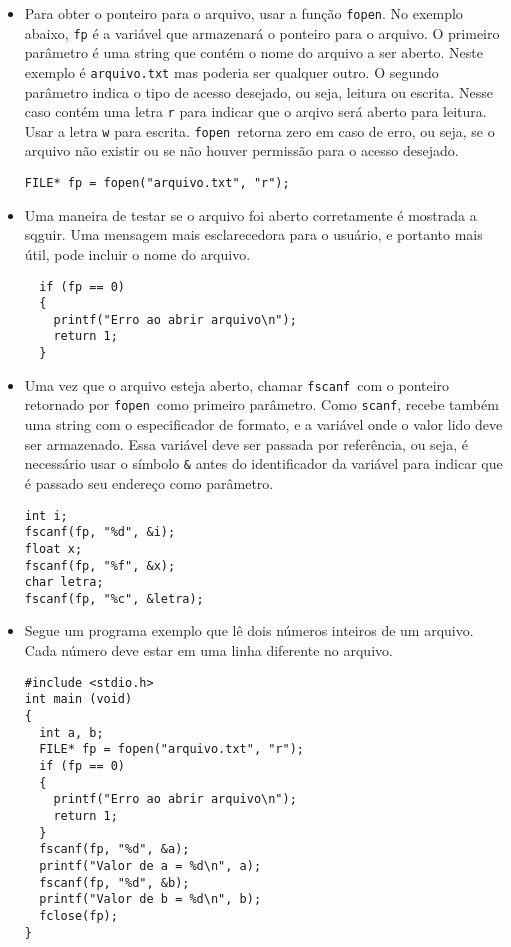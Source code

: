 \documentclass{book}
\newcommand{\SCANF}{{\tt scanf}}
\newcommand{\FSCANF}{{\tt fscanf}}
\newcommand{\FOPEN}{{\tt fopen}}
\begin{document}
\begin{itemize}

\item Para obter o ponteiro para o arquivo, usar a função \FOPEN. No exemplo abaixo, {\tt fp} é a variável que armazenará o ponteiro para o arquivo. O primeiro parâmetro é uma string que contém o nome do arquivo a ser aberto. Neste exemplo é {\tt arquivo.txt} mas poderia ser qualquer outro. O segundo parâmetro indica o tipo de acesso desejado, ou seja, leitura ou escrita. Nesse caso contém uma letra {\tt r} para indicar que o arqivo será aberto para leitura. Usar a letra {\tt w} para escrita. \FOPEN\ retorna zero em caso de erro, ou seja, se o arquivo não existir ou se não houver permissão para o acesso desejado.

\begin{lstlisting}
FILE* fp = fopen("arquivo.txt", "r");
\end{lstlisting}

\item Uma maneira de testar se o arquivo foi aberto corretamente é mostrada a sqguir. Uma mensagem mais esclarecedora para o usuário, e portanto mais útil, pode incluir o nome do arquivo.

\begin{lstlisting}
  if (fp == 0)
  {
    printf("Erro ao abrir arquivo\n");
    return 1;
  }
\end{lstlisting}


\item Uma vez que o arquivo esteja aberto, chamar \FSCANF\ com o ponteiro retornado por \FOPEN\ como primeiro parâmetro. Como \SCANF, recebe também uma string com o especificador de formato, e a variável onde o valor lido deve ser armazenado. Essa variável deve ser passada por referência, ou seja, é necessário usar o símbolo {\tt \&} antes do identificador da variável para indicar que é passado seu endereço como parâmetro.

\begin{lstlisting}
int i;
fscanf(fp, "%d", &i);
float x;
fscanf(fp, "%f", &x);
char letra;
fscanf(fp, "%c", &letra);
\end{lstlisting}

\item Segue um programa exemplo que lê dois números inteiros de um arquivo. Cada número deve estar em uma linha diferente no arquivo.

\begin{lstlisting}
#include <stdio.h> 
int main (void)
{
  int a, b;
  FILE* fp = fopen("arquivo.txt", "r");
  if (fp == 0)
  {
    printf("Erro ao abrir arquivo\n");
    return 1;
  }
  fscanf(fp, "%d", &a);
  printf("Valor de a = %d\n", a);
  fscanf(fp, "%d", &b);
  printf("Valor de b = %d\n", b);
  fclose(fp);
}
\end{lstlisting}


\end{itemize}
\end{document}
